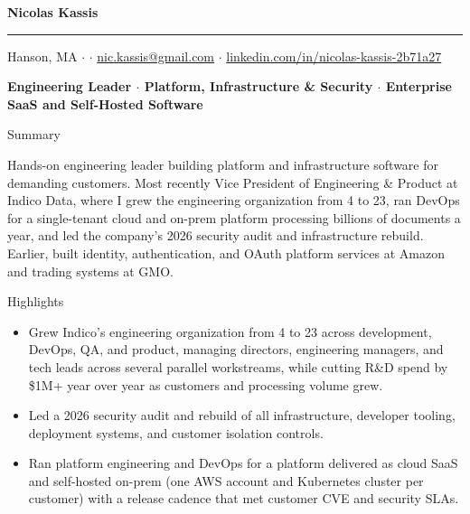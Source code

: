 \documentclass[10pt,oneside]{article}
\makeatletter
\newcommand{\name}{Nicolas Kassis}
\newcommand{\location}{Hanson, MA}
\newcommand{\email}{nic.kassis@gmail.com}
\newcommand{\linkedinurl}{linkedin.com/in/nicolas-kassis-2b71a27}
\providecommand*{\phone}{}
\newcommand{\phoneblock}{\ifx\phone\empty\else\phone{} \; $\cdot$ \; \fi}
\newcommand{\bigname}[1]{
  \begin{center}\fontfamily{phv}\selectfont\Huge\bfseries#1\end{center}
}
\newcommand{\headline}[1]{
  \begin{center}\fontfamily{phv}\selectfont\small\bfseries#1\end{center}
}
\newenvironment{ressection}[1]{
  \vspace{4pt}
  {\fontfamily{phv}\selectfont\Large#1}
  \begin{itemize}
    \vspace{3pt}
}{
  \end{itemize}
}
\newcommand{\ressubitem}[1]{
  \vspace{-1pt}
\item \begin{flushleft} #1 \end{flushleft}
}
\makeatother
\begin{document}
\bigname{\name}
\vspace{-8pt} \rule{\textwidth}{1pt}
\vspace{2pt}
\begin{center}
  {\small \location{} \; $\cdot$ \; \phoneblock\href{mailto:\email}{\email} \; $\cdot$ \; \href{https://\linkedinurl}{\linkedinurl}}
\end{center}
\headline{Engineering Leader $\cdot$ Platform, Infrastructure \& Security $\cdot$ Enterprise SaaS and Self-Hosted Software}
\vspace{6pt}

\vspace{4pt}
{\selectfont\Large Summary}
\vspace{3pt}

\begin{flushleft}
Hands-on engineering leader building platform and infrastructure software for demanding customers. Most recently Vice President of Engineering \& Product at Indico Data, where I grew the engineering organization from 4 to 23, ran DevOps for a single-tenant cloud and on-prem platform processing billions of documents a year, and led the company's 2026 security audit and infrastructure rebuild. Earlier, built identity, authentication, and OAuth platform services at Amazon and trading systems at GMO.
\end{flushleft}

\begin{ressection}{Highlights}
  \ressubitem{Grew Indico's engineering organization from 4 to 23 across development, DevOps, QA, and product, managing directors, engineering managers, and tech leads across several parallel workstreams, while cutting R\&D spend by \$1M+ year over year as customers and processing volume grew.}
  \ressubitem{Led a 2026 security audit and rebuild of all infrastructure, developer tooling, deployment systems, and customer isolation controls.}
  \ressubitem{Ran platform engineering and DevOps for a platform delivered as cloud SaaS and self-hosted on-prem (one AWS account and Kubernetes cluster per customer) with a release cadence that met customer CVE and security SLAs.}
\end{ressection}
\end{document}
